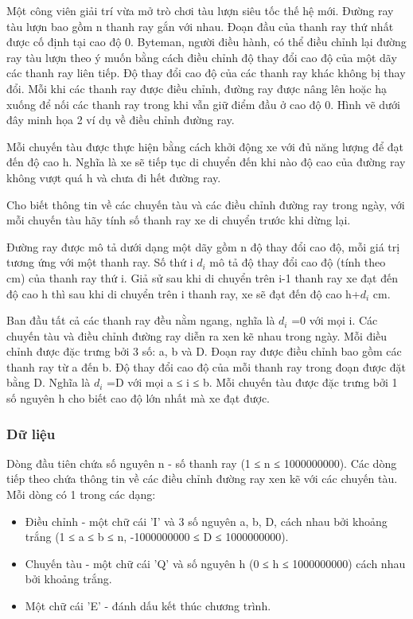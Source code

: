 



   Một công viên giải trí vừa mở trò chơi tàu lượn siêu tốc thế hệ mới. Đường ray tàu lượn bao gồm n thanh ray gắn với   nhau. Đoạn đầu của thanh ray thứ nhất được cố định tại cao độ 0. Byteman, người điều hành, có thể điều chỉnh lại đường   ray tàu lượn theo ý muốn bằng cách điều chỉnh       độ thay đổi cao độ      của một dãy các thanh ray liên tiếp. Độ thay   đổi cao độ của các thanh ray khác không bị thay đổi. Mỗi khi các thanh ray được điều chỉnh, đường ray được nâng lên   hoặc hạ xuống để nối các thanh ray trong khi vẫn giữ điểm đầu ở cao độ 0. Hình vẽ dưới đây minh họa 2 ví dụ về điều  chỉnh đường ray.  

   Mỗi chuyến tàu được thực hiện bằng cách khởi động xe với đủ năng lượng để đạt đến độ cao h. Nghĩa là xe sẽ tiếp tục   di chuyển đến khi nào độ cao của đường ray không vượt quá h và chưa đi hết đường ray.  

   Cho biết thông tin về các chuyến tàu và các điều chỉnh đường ray trong ngày, với mỗi chuyến tàu hãy tính số thanh ray   xe di chuyển trước khi dừng lại.  

   Đường ray được mô tả dưới dạng một dãy gồm n độ thay đổi cao độ, mỗi giá trị tương ứng với một thanh ray. Số thứ i   $d_{i}$   mô tả độ thay đổi cao độ (tính theo cm) của thanh ray thứ i. Giả sử sau khi di chuyển trên i-1 thanh ray xe   đạt đến độ cao h thì sau khi di chuyển trên i thanh ray, xe sẽ đạt đến độ cao h+$d_{i}$   cm.  

   Ban đầu tất cả các thanh ray đều nằm ngang, nghĩa là $d_{i}$   =0 với mọi i. Các chuyến tàu và điều chỉnh đường   ray diễn ra xen kẽ nhau trong ngày. Mỗi điều chỉnh được đặc trưng bởi 3 số: a, b và D. Đoạn ray được điều chỉnh bao gồm   các thanh ray từ a đến b. Độ thay đổi cao độ của mỗi thanh ray trong đoạn được đặt bằng D. Nghĩa là $d_{i}$   =D   với mọi a ≤ i ≤ b. Mỗi chuyến tàu được đặc trưng bởi 1 số nguyên h cho biết cao độ lớn nhất mà xe đạt được.  

\subsubsection{   Dữ liệu  }

   Dòng đầu tiên chứa số nguyên n - số thanh ray (1 ≤ n ≤ 1000000000). Các dòng tiếp theo chứa thông tin về các điều   chỉnh đường ray xen kẽ với các chuyến tàu. Mỗi dòng có 1 trong các dạng:  
\begin{itemize}
	\item     Điều chỉnh - một chữ cái 'I' và 3 số nguyên a, b, D, cách nhau bởi khoảng trắng (1 ≤ a ≤ b ≤ n, -1000000000 ≤ D ≤   1000000000).   
	\item     Chuyến tàu - một chữ cái 'Q' và số nguyên h (0 ≤  h ≤ 1000000000) cách nhau bởi khoảng trắng.   
	\item     Một chữ cái 'E' - đánh dấu kết thúc chương trình.   
\end{itemize}


